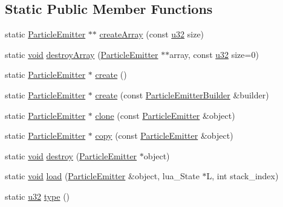 \subsection*{Static Public Member Functions}
\begin{DoxyCompactItemize}
\item 
static \mbox{\hyperlink{classnjli_1_1_particle_emitter}{Particle\+Emitter}} $\ast$$\ast$ \mbox{\hyperlink{classnjli_1_1_particle_emitter_a6449de8d6806afbcd8f06c9810bd8e1c}{create\+Array}} (const \mbox{\hyperlink{_util_8h_a10e94b422ef0c20dcdec20d31a1f5049}{u32}} size)
\item 
static \mbox{\hyperlink{_thread_8h_af1e856da2e658414cb2456cb6f7ebc66}{void}} \mbox{\hyperlink{classnjli_1_1_particle_emitter_ad802fa0111238cb87cd78cdb7242793d}{destroy\+Array}} (\mbox{\hyperlink{classnjli_1_1_particle_emitter}{Particle\+Emitter}} $\ast$$\ast$array, const \mbox{\hyperlink{_util_8h_a10e94b422ef0c20dcdec20d31a1f5049}{u32}} size=0)
\item 
static \mbox{\hyperlink{classnjli_1_1_particle_emitter}{Particle\+Emitter}} $\ast$ \mbox{\hyperlink{classnjli_1_1_particle_emitter_a08d13d496fe59ef6546eac4e56b3d45f}{create}} ()
\item 
static \mbox{\hyperlink{classnjli_1_1_particle_emitter}{Particle\+Emitter}} $\ast$ \mbox{\hyperlink{classnjli_1_1_particle_emitter_a3c0e274cedf2f51c2bcd47a77f03bd0f}{create}} (const \mbox{\hyperlink{classnjli_1_1_particle_emitter_builder}{Particle\+Emitter\+Builder}} \&builder)
\item 
static \mbox{\hyperlink{classnjli_1_1_particle_emitter}{Particle\+Emitter}} $\ast$ \mbox{\hyperlink{classnjli_1_1_particle_emitter_ae03b17179ffa67d76bbdde0fab1981ba}{clone}} (const \mbox{\hyperlink{classnjli_1_1_particle_emitter}{Particle\+Emitter}} \&object)
\item 
static \mbox{\hyperlink{classnjli_1_1_particle_emitter}{Particle\+Emitter}} $\ast$ \mbox{\hyperlink{classnjli_1_1_particle_emitter_aa54cb621ed2c6172df40158b0f504e9e}{copy}} (const \mbox{\hyperlink{classnjli_1_1_particle_emitter}{Particle\+Emitter}} \&object)
\item 
static \mbox{\hyperlink{_thread_8h_af1e856da2e658414cb2456cb6f7ebc66}{void}} \mbox{\hyperlink{classnjli_1_1_particle_emitter_a0c36e01f2a6c172eefafbaca5f328a5f}{destroy}} (\mbox{\hyperlink{classnjli_1_1_particle_emitter}{Particle\+Emitter}} $\ast$object)
\item 
static \mbox{\hyperlink{_thread_8h_af1e856da2e658414cb2456cb6f7ebc66}{void}} \mbox{\hyperlink{classnjli_1_1_particle_emitter_afe4f5827da78d6235c2ec2bca380a0e0}{load}} (\mbox{\hyperlink{classnjli_1_1_particle_emitter}{Particle\+Emitter}} \&object, lua\+\_\+\+State $\ast$L, int stack\+\_\+index)
\item 
static \mbox{\hyperlink{_util_8h_a10e94b422ef0c20dcdec20d31a1f5049}{u32}} \mbox{\hyperlink{classnjli_1_1_particle_emitter_a8d2f4b745a5f1529e87a15eebb5f9487}{type}} ()
\end{DoxyCompactItemize}
